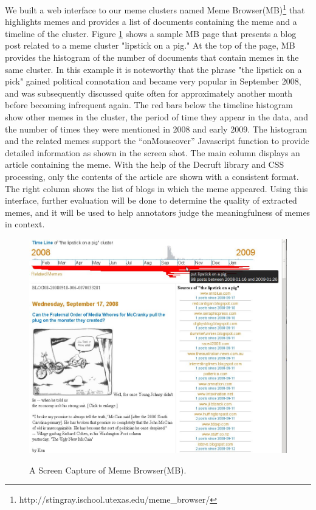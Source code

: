\documentclass{sig-alternate}
\begin{document}
We built a web interface to our meme clusters named Meme Browser(MB)\footnote{http://stingray.ischool.utexas.edu/meme\_browser/} that highlights memes and provides a list of documents containing the meme and a timeline of the cluster. Figure \ref{fig:mockup} shows a sample MB page that presents a blog post related to a meme cluster "lipstick on a pig." At the top of the page, MB provides the histogram of the number of documents that contain memes in the same cluster. In this example it is noteworthy that the phrase "the lipstick on a pick" gained political connotation and became very popular in September 2008, and was subsequently discussed quite often for approximately another month before becoming infrequent again. The red bars below the timeline histogram show other memes in the cluster, the period of time they appear in the data, and the number of times they were mentioned in 2008 and early 2009. The histogram and the related memes support the “onMouseover” Javascript function to provide detailed information as shown in the screen shot. The main column displays an article containing the meme. With the help of the Decruft library and CSS processing, only the contents of the article are shown with a consistent format. The right column shows the list of blogs in which the meme appeared. Using this interface, further evaluation will be done to determine the quality of extracted memes, and it will be used to help annotators judge the meaningfulness of memes in context.
\begin{figure}[htb]
	\begin{center}
		{\includegraphics[width=\textwidth]{mockup.jpg}}
	\end{center}
	\caption{A Screen Capture of Meme Browser(MB).}
	\label{fig:mockup}
\end{figure}
\end{document}
